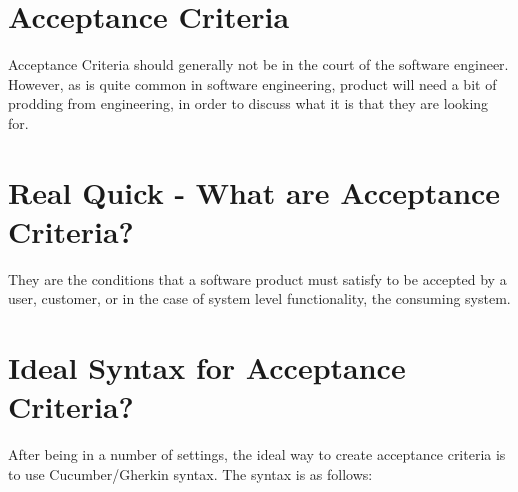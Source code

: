\maketitle{}
\section{ Acceptance Criteria }
Acceptance Criteria should generally not be in the court of the software
engineer. However, as is quite common in software engineering, product will
need a bit of prodding from engineering, in order to discuss what it is that
they are looking for.

\section{ Real Quick - What are Acceptance Criteria? }
They are the conditions that a software product must satisfy to be accepted by
a user, customer, or in the case of system level functionality, the consuming
system.

\section{ Ideal Syntax for Acceptance Criteria? }
After being in a number of settings, the ideal way to create acceptance criteria
is to use Cucumber/Gherkin syntax. The syntax is as follows:
